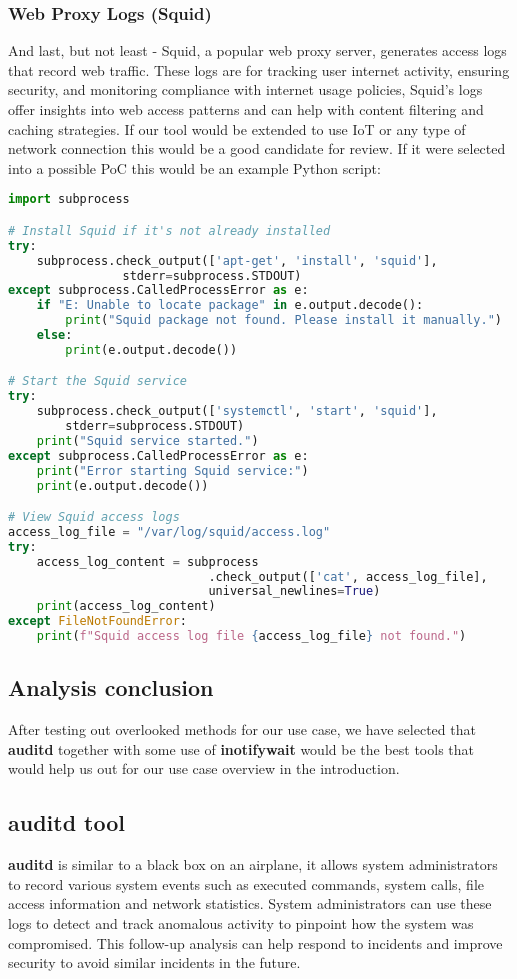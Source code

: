 \documentclass{VUMIFPSmagistrinis}
\begin{document}
\subsubsection{Web Proxy Logs (Squid)}
And last, but not least - Squid, a popular web proxy server, generates access logs that record web traffic. These logs are for tracking user internet activity, ensuring security, and monitoring compliance with internet usage policies, Squid's logs offer insights into web access patterns and can help with content filtering and caching strategies. If our tool would be extended to use IoT or any type of network connection this would be a good candidate for review. If it were selected into a possible PoC this would be an example Python script:
\begin{lstlisting}[language=Python]
import subprocess

# Install Squid if it's not already installed
try:
    subprocess.check_output(['apt-get', 'install', 'squid'], 
                stderr=subprocess.STDOUT)
except subprocess.CalledProcessError as e:
    if "E: Unable to locate package" in e.output.decode():
        print("Squid package not found. Please install it manually.")
    else:
        print(e.output.decode())

# Start the Squid service
try:
    subprocess.check_output(['systemctl', 'start', 'squid'], 
        stderr=subprocess.STDOUT)
    print("Squid service started.")
except subprocess.CalledProcessError as e:
    print("Error starting Squid service:")
    print(e.output.decode())

# View Squid access logs
access_log_file = "/var/log/squid/access.log"
try:
    access_log_content = subprocess
                            .check_output(['cat', access_log_file], 
                            universal_newlines=True)
    print(access_log_content)
except FileNotFoundError:
    print(f"Squid access log file {access_log_file} not found.")
\end{lstlisting}

\subsection{Analysis conclusion}
After testing out overlooked methods for our use case, we have selected that \textbf{auditd} together with some use of \textbf{inotifywait} would be the best tools that would help us out for our use case overview in the introduction.

\subsection{auditd tool}
\textbf{auditd} is similar to a black box on an airplane, it allows system administrators to record various system events such as executed commands, system calls, file access information and network statistics. System administrators can use these logs to detect and track anomalous activity to pinpoint how the system was compromised. This follow-up analysis can help respond to incidents and improve security to avoid similar incidents in the future.
\end{document}
